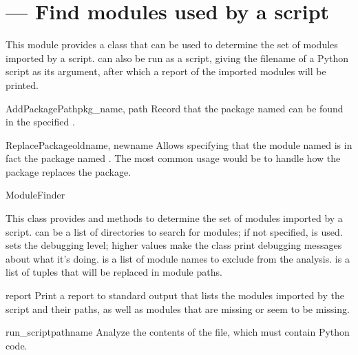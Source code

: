 \section{ ---
         Find modules used by a script}



This module provides a  class that can be used to
determine the set of modules imported by a script.
 can also be run as a script, giving the
filename of a Python script as its argument, after which a report of
the imported modules will be printed.

\begin{funcdesc}{AddPackagePath}{pkg_name, path}
Record that the package named  can be found in the specified .
\end{funcdesc}

\begin{funcdesc}{ReplacePackage}{oldname, newname}
Allows specifying that the module named  is in fact
the package named .  The most common usage would be 
to handle how the  package replaces the 
package.
\end{funcdesc}

\begin{classdesc}{ModuleFinder}{}

This class provides  and 
methods to determine the set of modules imported by a script.
 can be a list of directories to search for modules; if not
specified,  is used. 
 sets the debugging level; higher values make the class print 
debugging messages about what it's doing.
 is a list of module names to exclude from the analysis.
 is a list of 
tuples that will be replaced in module paths.
\end{classdesc}

\begin{methoddesc}[ModuleFinder]{report}{}
Print a report to standard output that lists the modules imported by the script
and their
paths, as well as modules that are missing or seem to be missing.
\end{methoddesc}

\begin{methoddesc}[ModuleFinder]{run_script}{pathname}
Analyze the contents of the  file, which must contain 
Python code.
\end{methoddesc}
 

